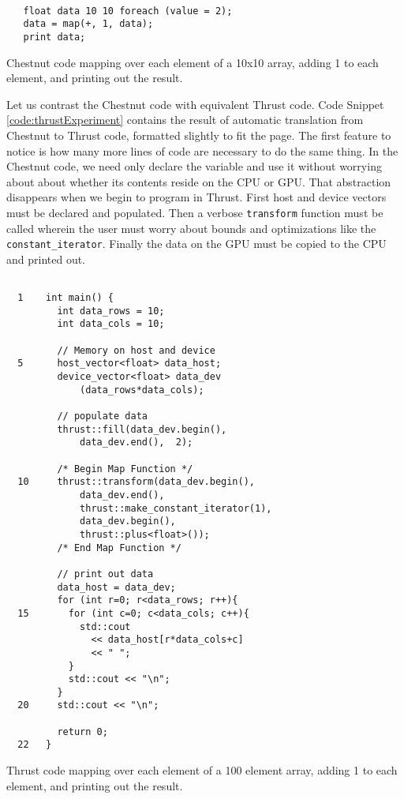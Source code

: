 \documentclass[twocolumn]{article}
\renewcommand{\|}{\origbar} %
\newcommand{\code}[1]{\texttt{#1}}
\begin{document}
\begin{Code Snippet}
\begin{verbatim}

   float data 10 10 foreach (value = 2);
   data = map(+, 1, data);
   print data;
\end{verbatim}
\caption{Chestnut code mapping over each element of a 10x10 array, adding 1 to each element, and printing out the result.}
\label{code:chestnutExperiment}
\end{Code Snippet}

Let us contrast the Chestnut code with equivalent Thrust code. Code Snippet \ref{code:thrustExperiment} contains the result of automatic translation from Chestnut to Thrust code, formatted slightly to fit the page. The first feature to notice is how many more lines of code are necessary to do the same thing. In the Chestnut code, we need only declare the variable and use it without worrying about about whether its contents reside on the CPU or GPU. That abstraction disappears when we begin to program in Thrust. First host and device vectors must be declared and populated. Then a verbose \code{transform} function must be called wherein the user must worry about bounds and optimizations like the \code{constant\_iterator}. Finally the data on the GPU must be copied to the CPU and printed out. 

\begin{Code Snippet}
\begin{verbatim}

  1    int main() {
         int data_rows = 10;
         int data_cols = 10;

         // Memory on host and device
  5      host_vector<float> data_host; 
         device_vector<float> data_dev
             (data_rows*data_cols); 

         // populate data
         thrust::fill(data_dev.begin(),
             data_dev.end(),  2);

         /* Begin Map Function */
  10     thrust::transform(data_dev.begin(), 
             data_dev.end(), 
             thrust::make_constant_iterator(1), 
             data_dev.begin(), 
             thrust::plus<float>()); 
         /* End Map Function */

         // print out data
         data_host = data_dev;
         for (int r=0; r<data_rows; r++){
  15       for (int c=0; c<data_cols; c++){
             std::cout
               << data_host[r*data_cols+c]
               << " ";
           }
           std::cout << "\n";
         }
  20     std::cout << "\n";

         return 0;
  22   }
\end{verbatim}
\caption{Thrust code mapping over each element of a 100 element array, adding 1 to each element, and printing out the result.}
\label{code:thrustExperiment}
\end{Code Snippet}
\end{document}
